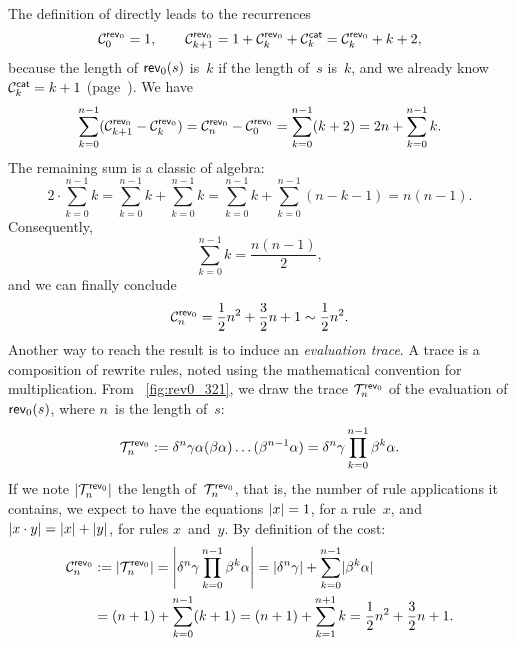 The definition of 
directly leads to the recurrences
\begin{equation*}
\C{\fun{rev}_0}{0} = 1,\qquad \C{\fun{rev}_0}{k+1} = 1 +
\C{\fun{rev}_0}{k} + \C{\fun{cat}}{k} = \C{\fun{rev}_0}{k} + k + 2,
\end{equation*}
because the length of \(\fun{rev}_0(s)\) is~\(k\) if the length
of~\(s\) is~\(k\), and we already know \(\C{\fun{cat}}{k} = k +
1\) (page~\pageref{cost:cat}). We have
\begin{equation*}
\sum_{k=0}^{n-1}(\C{\fun{rev}_0}{k+1} - \C{\fun{rev}_0}{k}) =
\C{\fun{rev}_0}{n} - \C{\fun{rev}_0}{0} = 
\sum_{k=0}^{n-1}(k+2) = 2n + \sum_{k=0}^{n-1}{k}.
\end{equation*}
The remaining sum is a classic of algebra:
\begin{equation*}
2 \cdot \sum_{k=0}^{n-1}{k} = 
\sum_{k=0}^{n-1}{k} + \sum_{k=0}^{n-1}{k} = 
\sum_{k=0}^{n-1}{k} + \sum_{k=0}^{n-1}(n-k-1) = n(n-1).
\end{equation*}
Consequently,
\begin{equation}
\sum_{k=0}^{n-1}{k} = \frac{n(n-1)}{2},\label{eq:sum_k}
\end{equation}
and we can finally conclude
\begin{equation*}
\C{\fun{rev}_0}{n} = \frac{1}{2}n^2 + \frac{3}{2}n + 1 \sim \frac{1}{2}n^2.
\end{equation*}
Another way to reach the result is to induce an \emph{evaluation
  trace}. A trace is a
composition of rewrite rules, noted using the mathematical convention
for multiplication. From \fig~\vref{fig:rev0_321}, we draw the trace
\(\T{\fun{rev}_0}{n}\) of the
evaluation of \(\fun{rev}_0(s)\), where
\(n\)~is the length of~\(s\):
\begin{equation*}
\T{\fun{rev}_0}{n} :=
\delta^n\gamma\alpha(\beta\alpha)\dots(\beta^{n-1}\alpha) =
\delta^n\gamma \prod_{k=0}^{n-1}{\beta^k\alpha}.
\end{equation*}
If we note
\(\len{\T{\fun{rev}_0}{n}}\)
the length of~\(\T{\fun{rev}_0}{n}\), that is, the number of rule
applications it contains, we expect to have the equations \(\len{x} =
1\), for a rule~\(x\), and \(\len{x \cdot y} = \len{x} + \len{y}\),
for rules \(x\)~and~\(y\). By definition of the
cost:
\begin{align*}
\C{\fun{rev}_0}{n}
  &:= \len{\T{\fun{rev}_0}{n}}
    = \left\lvert\delta^n\gamma 
        \prod_{k=0}^{n-1}{\beta^k\alpha}\right\lvert
    = \len{\delta^n\gamma} + \sum_{k=0}^{n-1}\len{\beta^k\alpha}\\
   &= (n+1) + \sum_{k=0}^{n-1}(k+1) = (n+1) + \sum_{k=1}^{n+1}k
    = \frac{1}{2}n^2 + \frac{3}{2}n + 1.
\end{align*}

